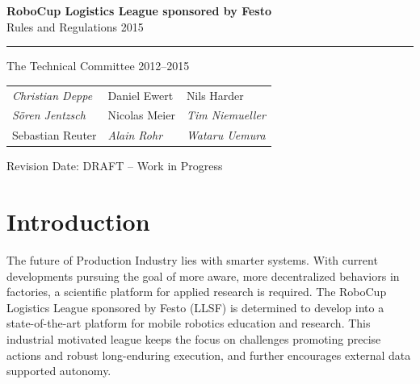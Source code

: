 \documentclass[12pt,twoside]{article}
\begin{document}
\hypersetup{pageanchor=false}


\begin{titlepage}
  \vspace*{5cm}
  \begin{center}
    \begin{LARGE}
      
      {\bf RoboCup Logistics League sponsored by Festo}\\[2ex]
      {\Large Rules and Regulations 2015}\\[4ex]
    \end{LARGE}
    \hrule
    
    {\LARGE\vspace*{4ex}}
    \begin{Large}
      The Technical Committee 2012--2015\\[6ex]
    \end{Large}
    \begin{tabular}{lll}
    \emph{Christian Deppe}&Daniel Ewert&Nils Harder\\
    \emph{S\"oren Jentzsch}&Nicolas Meier&\emph{Tim Niemueller}\\
      Sebastian Reuter&\emph{Alain Rohr}&\emph{Wataru Uemura}\\
    \end{tabular}
    \vfill
    Revision Date: DRAFT -- Work in Progress %
  \end{center}
\end{titlepage}
\thispagestyle{empty}
\pagebreak
\clearpage

\hypersetup{pageanchor=true}
\setcounter{page}{1}
\tableofcontents
\newpage
\cleardoublepage

\setcounter{page}{1}

\section{Introduction}
\label{sec:intro}
The future of Production Industry lies with smarter systems.  With
current developments pursuing the goal of more aware, more
decentralized behaviors in factories, a scientific platform for
applied research is required.  The RoboCup Logistics League sponsored
by Festo (LLSF) is determined to develop into a state-of-the-art
platform for mobile robotics education and research. This industrial
motivated league keeps the focus on challenges promoting precise
actions and robust long-enduring execution, and further encourages
external data supported autonomy.
\end{document}
